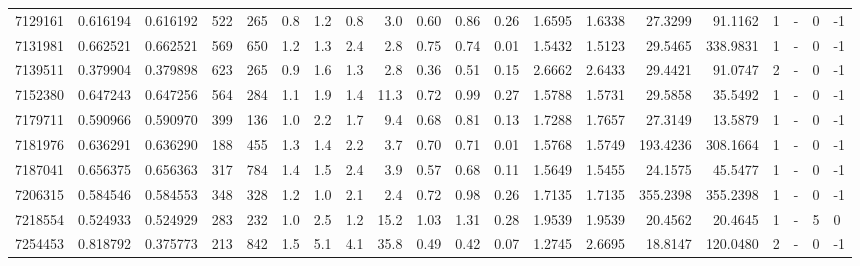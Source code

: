 \begin{tabular}{rrrrrrrrrrrrrrrrrlrl}
   7129161 & 0.616194 &   0.616192 &  522 &  265 &      0.8 &      1.2 &     0.8 &      3.0 &       0.60 &        0.86 &        0.26 &  1.6595 &  1.6338 &   27.3299 &   91.1162 &       1 &             - &        0 &        -1 \\
   7131981 & 0.662521 &   0.662521 &  569 &  650 &      1.2 &      1.3 &     2.4 &      2.8 &       0.75 &        0.74 &        0.01 &  1.5432 &  1.5123 &   29.5465 &  338.9831 &       1 &             - &        0 &        -1 \\
   7139511 & 0.379904 &   0.379898 &  623 &  265 &      0.9 &      1.6 &     1.3 &      2.8 &       0.36 &        0.51 &        0.15 &  2.6662 &  2.6433 &   29.4421 &   91.0747 &       2 &             - &        0 &        -1 \\
   7152380 & 0.647243 &   0.647256 &  564 &  284 &      1.1 &      1.9 &     1.4 &     11.3 &       0.72 &        0.99 &        0.27 &  1.5788 &  1.5731 &   29.5858 &   35.5492 &       1 &             - &        0 &        -1 \\
   7179711 & 0.590966 &   0.590970 &  399 &  136 &      1.0 &      2.2 &     1.7 &      9.4 &       0.68 &        0.81 &        0.13 &  1.7288 &  1.7657 &   27.3149 &   13.5879 &       1 &             - &        0 &        -1 \\
   7181976 & 0.636291 &   0.636290 &  188 &  455 &      1.3 &      1.4 &     2.2 &      3.7 &       0.70 &        0.71 &        0.01 &  1.5768 &  1.5749 &  193.4236 &  308.1664 &       1 &             - &        0 &        -1 \\
   7187041 & 0.656375 &   0.656363 &  317 &  784 &      1.4 &      1.5 &     2.4 &      3.9 &       0.57 &        0.68 &        0.11 &  1.5649 &  1.5455 &   24.1575 &   45.5477 &       1 &             - &        0 &        -1 \\
   7206315 & 0.584546 &   0.584553 &  348 &  328 &      1.2 &      1.0 &     2.1 &      2.4 &       0.72 &        0.98 &        0.26 &  1.7135 &  1.7135 &  355.2398 &  355.2398 &       1 &             - &        0 &        -1 \\
   7218554 & 0.524933 &   0.524929 &  283 &  232 &      1.0 &      2.5 &     1.2 &     15.2 &       1.03 &        1.31 &        0.28 &  1.9539 &  1.9539 &   20.4562 &   20.4645 &       1 &             - &        5 &         0 \\
   7254453 & 0.818792 &   0.375773 &  213 &  842 &      1.5 &      5.1 &     4.1 &     35.8 &       0.49 &        0.42 &        0.07 &  1.2745 &  2.6695 &   18.8147 &  120.0480 &       2 &             - &        0 &        -1 \\

\end{tabular}
